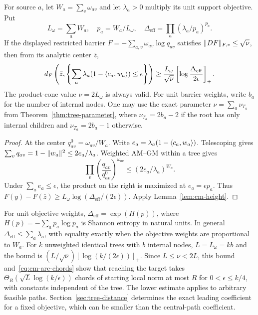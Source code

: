 \begin{proposition}
\label{prop:cm-tree-entropy}
For source $a$, let $W_a=\sum_v\omega_{av}$ and let
$\lambda_a>0$ multiply its unit support objective.  Put
\[
 L_\omega=\sum_aW_a,\quad p_a=W_a/L_\omega,\quad
 \Delta_{\mathrm{eff}}=\prod_a(\lambda_a/p_a)^{p_a}.
\]
If the displayed restricted barrier
$F=-\sum_{a,v}\omega_{av}\log q_{av}$ satisfies
$\lVert DF\rVert_{F,*}\leq\sqrt\nu$, then from its analytic center $\bar z$,
\begin{equation}\label{eq:cm-tree-entropy}
 d_F\left(\bar z,
 \left\{\sum_a\lambda_a(1-\langle c_a,w_a\rangle)\leq\epsilon\right\}\right)
 \geq\frac{L_\omega}{\sqrt\nu}
 \left[\log\frac{\Delta_{\mathrm{eff}}}{2\epsilon}\right]_+.
\end{equation}
The product-cone value $\nu=2L_\omega$ is always valid.
For unit barrier weights, write $b_a$ for the number of internal
nodes.  One may use the exact parameter
$\nu=\sum_a\nu_{T_a}$ from Theorem~\ref{thm:tree-parameter}, where
$\nu_{T_a}=2b_a-2$ if the root has only internal children and
$\nu_{T_a}=2b_a-1$ otherwise.
\end{proposition}
\begin{proof}
At the center $q_{av}^0=\omega_{av}/W_a$.  Write
$e_a=\lambda_a(1-\langle c_a,w_a\rangle)$.  Telescoping gives
$\sum_vq_{av}=1-\lVert w_a\rVert^2\leq2e_a/\lambda_a$.
Weighted AM--GM within a tree gives
\[
 \prod_v\left(\frac{q_{av}}{q_{av}^0}\right)^{\omega_{av}}
 \leq(2e_a/\lambda_a)^{W_a}.
\]
Under $\sum_ae_a\leq\epsilon$, the product on the right is
maximized at $e_a=\epsilon p_a$.  Thus
$F(y)-F(\bar z)\geq L_\omega\log(\Delta_{\mathrm{eff}}/(2\epsilon))$.
Apply Lemma~\ref{lem:cm-height}.
\end{proof}

For unit objective weights, $\Delta_{\mathrm{eff}}=\exp(H(p))$,
where $H(p)=-\sum_ap_a\log p_a$ is Shannon entropy in natural units.
In general $\Delta_{\mathrm{eff}}\leq\sum_a\lambda_a$, with equality
exactly when the objective weights are proportional to $W_a$.
For $k$ unweighted identical trees with $b$ internal nodes,
$L=L_\omega=kb$ and the bound is
$(L/\sqrt\nu)[\log(k/(2\epsilon))]_+$.
Since $L\leq\nu<2L$, this bound and~\eqref{eq:cm-arc-chords} show
that reaching the target takes
$\Theta_R(\sqrt L\log(k/\epsilon))$ chords of starting local norm at
most $R$ for $0<\epsilon\leq k/4$, with
constants independent of the tree.
The lower estimate applies to arbitrary feasible paths.
Section~\ref{sec:tree-distance} determines the exact leading coefficient
for a fixed objective, which can be smaller than the central-path
coefficient.

